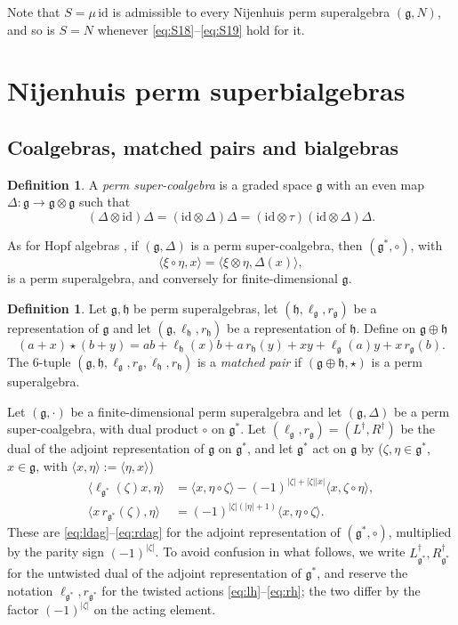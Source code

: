 \documentclass[11pt]{article}
\theoremstyle{definition}
\newtheorem{definition}[theorem]{Definition}
\newcommand{\g}{\mathfrak{g}}
\newcommand{\h}{\mathfrak{h}}
\newcommand{\id}{\mathrm{id}}
\newcommand{\lr}[1]{\langle #1\rangle}
\begin{document}
Note that $S=\mu\,\id$ is admissible to every Nijenhuis perm superalgebra $(\g,N)$, and so is $S=N$ whenever \eqref{eq:S18}--\eqref{eq:S19} hold for it.

\section{Nijenhuis perm superbialgebras}\label{sec:bialg}

\subsection{Coalgebras, matched pairs and bialgebras}

\begin{definition}\label{def:coalgebra}
A \emph{perm super-coalgebra} is a graded space $\g$ with an even map $\Delta:\g\to\g\otimes\g$ such that
\begin{equation}\label{eq:coperm}
(\Delta\otimes\id)\Delta=(\id\otimes\Delta)\Delta
=(\id\otimes\tau)(\id\otimes\Delta)\Delta.
\end{equation}
\end{definition}

As for Hopf algebras \cite{Sw}, if $(\g,\Delta)$ is a perm super-coalgebra, then $(\g^*,\circ)$, with
\[
\lr{\xi\circ\eta,x}=\lr{\xi\otimes\eta,\Delta(x)},
\]
is a perm superalgebra, and conversely for finite-dimensional $\g$.

\begin{definition}\label{def:matched}
Let $\g,\h$ be perm superalgebras, let $(\h,\ell_\g,r_\g)$ be a representation of $\g$ and let $(\g,\ell_\h,r_\h)$ be a representation of $\h$. Define on $\g\oplus\h$
\begin{equation}\label{eq:star}
(a+x)\star(b+y)
=ab+\ell_\h(x)b+a\,r_\h(y)+xy+\ell_\g(a)y+x\,r_\g(b).
\end{equation}
The $6$-tuple $(\g,\h,\ell_\g,r_\g,\ell_\h,r_\h)$ is a \emph{matched pair} if $(\g\oplus\h,\star)$ is a perm superalgebra.
\end{definition}

Let $(\g,\cdot)$ be a finite-dimensional perm superalgebra and let $(\g,\Delta)$ be a perm super-coalgebra, with dual product $\circ$ on $\g^*$. Let $(\ell_\g,r_\g)=(L^\dagger,R^\dagger)$ be the dual of the adjoint representation of $\g$ on $\g^*$, and let $\g^*$ act on $\g$ by ($\zeta,\eta\in\g^*$, $x\in\g$, with $\lr{x,\eta}:=\lr{\eta,x}$)
\begin{align}
\lr{\ell_{\g^*}(\zeta)x,\eta}
&=\lr{x,\eta\circ\zeta}
-(-1)^{|\zeta|+|\zeta||x|}\lr{x,\zeta\circ\eta},\label{eq:lh}\\
\lr{x\,r_{\g^*}(\zeta),\eta}
&=(-1)^{|\zeta|(|\eta|+1)}\lr{x,\eta\circ\zeta}.\label{eq:rh}
\end{align}
These are \eqref{eq:ldag}--\eqref{eq:rdag} for the adjoint representation of $(\g^*,\circ)$, multiplied by the parity sign $(-1)^{|\zeta|}$. To avoid confusion in what follows, we write $L^\dagger_{\g^*},R^\dagger_{\g^*}$ for the untwisted dual of the adjoint representation of $\g^*$, and reserve the notation $\ell_{\g^*},r_{\g^*}$ for the twisted actions \eqref{eq:lh}--\eqref{eq:rh}; the two differ by the factor $(-1)^{|\zeta|}$ on the acting element.
\end{document}
